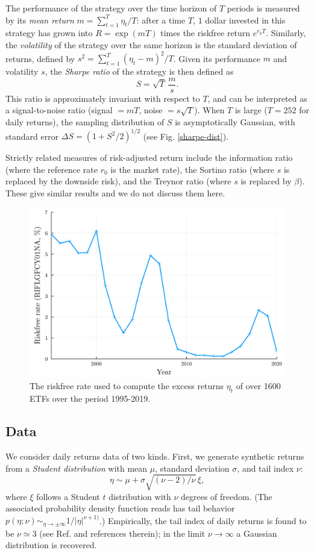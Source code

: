 \documentclass[
reprint,
amsmath,amssymb,
aps,
]{revtex4-2}
\begin{document}
The performance of the strategy over the time horizon of $T$ periods is measured by its \emph{mean return} $m = \sum_{t=1}^T \eta_{t}/T$: after a time $T$, $1$ dollar invested in this strategy has grown into $R = \exp(mT)$ times the riskfree return $e^{r_0T}$. 
Similarly, the \emph{volatility} of the strategy over the same horizon is the standard deviation of returns, defined by $s^2 = \sum_{t=1}^T (\eta_{t} - m)^2/T$.
Given its performance $m$ and volatility $s$, the \emph{Sharpe ratio} of the strategy is then defined as 
\begin{equation}
    S = \sqrt{T}\, \frac{m}{s}.    
\end{equation}
This ratio is approximately invariant with respect to $T$, and can be interpreted as a signal-to-noise ratio (signal $=mT$, noise $=s\sqrt{T}$). When $T$ is large ($T = 252$ for daily returns), the sampling distribution of $S$ is asymptotically Gaussian, with standard error $\Delta S = (1+S^2/2)^{1/2}$ \cite{loStatistics2002} (see Fig. \ref{sharpe-dist}).

Strictly related measures of risk-adjusted return include the information ratio (where the reference rate $r_0$ is the market rate), the Sortino ratio (where $s$ is replaced by the downside risk), and the Treynor ratio (where $s$ is replaced by $\beta$). These give similar results and we do not discuss them here.  


\begin{figure}[t!]
    \includegraphics[width = .45\textwidth]{../plots/riskfree-rate.png}
    \caption{The riskfree rate used to compute the excess returns $\eta_t$ of over 1600 ETFs over the period 1995-2019.}
    \label{riskfree-rate}
\end{figure}

\subsection{Data}

We consider daily returns data of two kinds. First, we generate synthetic returns from a \emph{Student distribution} with mean $\mu$, standard deviation $\sigma$, and tail index $\nu$:
\begin{equation}
    \eta \sim \mu + \sigma\sqrt{(\nu - 2)/\nu}\, \xi,
\end{equation}
where $\xi$ follows a Student $t$ distribution with $\nu$ degrees of freedom. (The associated probability density function reads has tail behavior $p(\eta; \nu)\sim_{\eta\to\pm\infty} 1/\vert\eta\vert^{\nu + 1)}$.) Empirically, the tail index of daily returns is found to be $\nu\simeq 3$ (see Ref. \cite{bouchaudTheory2003} and references therein); in the limit $\nu\to\infty$ a Gaussian distribution is recovered. 
\end{document}
